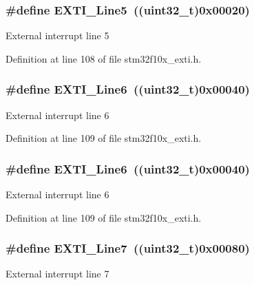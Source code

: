 \subsubsection[{\texorpdfstring{E\+X\+T\+I\+\_\+\+Line5}{EXTI_Line5}}]{\setlength{\rightskip}{0pt plus 5cm}\#define E\+X\+T\+I\+\_\+\+Line5~(({\bf uint32\+\_\+t})0x00020)}\hypertarget{group___e_x_t_i___lines_ga6b4c6292e3abd521cab2bf99d37a15c6}{}\label{group___e_x_t_i___lines_ga6b4c6292e3abd521cab2bf99d37a15c6}
External interrupt line 5 

Definition at line 108 of file stm32f10x\+\_\+exti.\+h.

\subsubsection[{\texorpdfstring{E\+X\+T\+I\+\_\+\+Line6}{EXTI_Line6}}]{\setlength{\rightskip}{0pt plus 5cm}\#define E\+X\+T\+I\+\_\+\+Line6~(({\bf uint32\+\_\+t})0x00040)}\hypertarget{group___e_x_t_i___lines_ga97a5145d1d2612dd53bdd9db3d366873}{}\label{group___e_x_t_i___lines_ga97a5145d1d2612dd53bdd9db3d366873}
External interrupt line 6 

Definition at line 109 of file stm32f10x\+\_\+exti.\+h.

\subsubsection[{\texorpdfstring{E\+X\+T\+I\+\_\+\+Line6}{EXTI_Line6}}]{\setlength{\rightskip}{0pt plus 5cm}\#define E\+X\+T\+I\+\_\+\+Line6~(({\bf uint32\+\_\+t})0x00040)}\hypertarget{group___e_x_t_i___lines_ga97a5145d1d2612dd53bdd9db3d366873}{}\label{group___e_x_t_i___lines_ga97a5145d1d2612dd53bdd9db3d366873}
External interrupt line 6 

Definition at line 109 of file stm32f10x\+\_\+exti.\+h.

\subsubsection[{\texorpdfstring{E\+X\+T\+I\+\_\+\+Line7}{EXTI_Line7}}]{\setlength{\rightskip}{0pt plus 5cm}\#define E\+X\+T\+I\+\_\+\+Line7~(({\bf uint32\+\_\+t})0x00080)}\hypertarget{group___e_x_t_i___lines_ga3b7155d54a4a98394b599718901ccbe5}{}\label{group___e_x_t_i___lines_ga3b7155d54a4a98394b599718901ccbe5}
External interrupt line 7 

